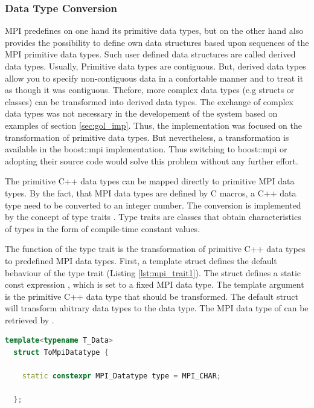 \subsubsection{Data Type Conversion}
\label{sec:data_type_conversion}
MPI predefines on one hand its primitive data types, but on the other
hand also provides the possibility to define own data structures based
upon sequences of the MPI primitive data types. Such user defined data
structures are called derived data types. Usually, Primitive data
types are contiguous. But, derived data types allow you to specify
non-contiguous data in a confortable manner and to treat it as though
it was contiguous.  Thefore, more complex data types (e.g structs or
classes) can be transformed into derived data types. The exchange
of complex data types was not necessary in the developement of the
system based on examples of section \ref{sec:gol_imp}. Thus, the
implementation was focused on the transformation of primitive data
types.  But nevertheless, a transformation is available in the
boost::mpi \cite{ref:boost_mpi} implementation. Thus switching to
boost::mpi or adopting their source code would solve this problem
without any further effort.

The primitive C++ data types can be mapped directly to primitive MPI
data types. By the fact, that MPI data types are defined by C macros,
a C++ data type need to be converted to an integer number. The
conversion is implemented by the concept of type traits
\cite{ref:type_trait}.  Type traits are classes that obtain
characteristics of types in the form of compile-time constant values.

The function of the type trait is the transformation of primitive C++
data types to predefined MPI data types.  First, a template struct
defines the default behaviour of the type trait (Listing
\ref{lst:mpi_trait1}). The struct defines a static const expression
, which is set to a fixed MPI data type. The template
argument  is the primitive C++ data type that should be
transformed. The default struct will transform abitrary data types
 to the  data type. The MPI data type of
 can be retrieved by .


\begin{lstlisting}[language=C++, label=lst:mpi_trait1]
  template<typename T_Data> 
  struct ToMpiDatatype { 

    static constexpr MPI_Datatype type = MPI_CHAR; 

  };
\end{lstlisting}


